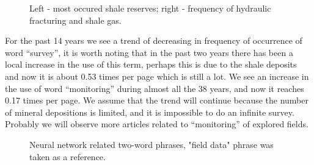 \documentclass[geosciences,article,submit,moreauthors,pdftex]{Definitions/mdpi}
\begin{document}
\begin{figure}[ht!]

\begin{minipage}{0.49\linewidth}
\end{minipage}
\hfill
\begin{minipage}{0.49\linewidth}
\end{minipage}

\caption{Left - most occured shale reserves; right -  frequency of hydraulic fracturing and shale gas.}
\label{shales_frac}
\end{figure}


For the past 14 years we see a trend of decreasing in frequency of occurrence of word “survey”, it is worth noting that in the past two years there has been a local increase in the use of this term, perhaps this is due to the shale deposits and now it is about 0.53 times per page which is still a lot. We see an increase in the use of word “monitoring” during almost all the 38 years, and now it reaches 0.17 times per page. We assume that the trend will continue because the number of mineral depositions is limited, and it is impossible to do an infinite survey. Probably we will observe more articles related to “monitoring” of explored fields.


\begin{figure}[ht!]

\begin{minipage}{0.49\linewidth}
\end{minipage}
\hfill
\begin{minipage}{0.49\linewidth}
\end{minipage}

\caption{Neural network related two-word phrases, "field data" phrase was taken as a reference.}
\label{neur_netw}
\end{figure}
\end{document}
